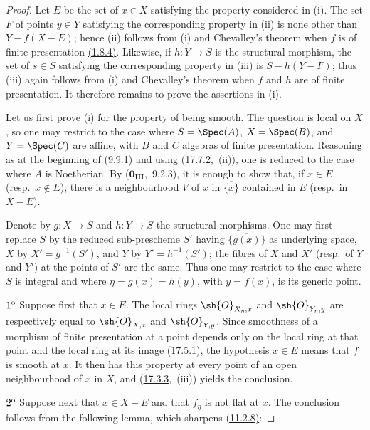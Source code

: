 \begin{proof}
Let $E$ be the set of $x\in X$ satisfying the property considered in (i).
The set $F$ of points $y\in Y$ satisfying the corresponding property in (ii) is none other than $Y-f(X-E)$; hence (ii) follows from (i) and Chevalley's theorem when $f$ is of finite presentation {\hyperlink{ega4.c04.thm.1-8-4}{(1.8.4)}}.
Likewise, if $h:Y\to S$ is the structural morphism, the set of $s\in S$ satisfying the corresponding property in (iii) is $S-h(Y-F)$; thus (iii) again follows from (i) and Chevalley's theorem when $f$ and $h$ are of finite presentation.
It therefore remains to prove the assertions in (i).

Let us first prove (i) for the property of being smooth.
The question is local on $X$, so one may restrict to the case where $S=\Spec(A)$, $X=\Spec(B)$, and $Y=\Spec(C)$ are affine, with $B$ and $C$ algebras of finite presentation.
Reasoning as at the beginning of {\hyperlink{ega4.c04.prop.9-9-1}{(9.9.1)}} and using ({\hyperlink{ega4.c04.cor.17-7-2}{17.7.2}},~(ii)), one is reduced to the case where $A$ is Noetherian.
By ($\mathbf{0}_\mathbf{III}$,~9.2.3), it is enough to show that, if $x\in E$ (resp.\ $x\notin E$), there is a neighbourhood $V$ of $x$ in $\overline{\{x\}}$ contained in $E$ (resp.\ in $X-E$).

Denote by $g:X\to S$ and $h:Y\to S$ the structural morphisms.
One may first replace $S$ by the reduced sub-prescheme $S'$ having $\overline{\{g(x)\}}$ as underlying space, $X$ by $X'=g^{-1}(S')$, and $Y$ by $Y'=h^{-1}(S')$; the fibres of $X$ and $X'$ (resp.\ of $Y$ and $Y'$) at the points of $S'$ are the same.
Thus one may restrict to the case where $S$ is integral and where $\eta=g(x)=h(y)$, with $y=f(x)$, is its generic point.

$1\textsuperscript{o}$ Suppose first that $x\in E$.
The local rings $\sh{O}_{X_\eta,x}$ and $\sh{O}_{Y_\eta,y}$ are respectively equal to $\sh{O}_{X,x}$ and $\sh{O}_{Y,y}$.
Since smoothness of a morphism of finite presentation at a point depends only on the local ring at that point and the local ring at its image {\hyperlink{ega4.c04.thm.17-5-1}{(17.5.1)}}, the hypothesis $x\in E$ means that $f$ is smooth at $x$.
It then has this property at every point of an open neighbourhood of $x$ in $X$, and ({\hyperlink{ega4.c04.prop.17-3-3}{17.3.3}},~(iii)) yields the conclusion.

$2\textsuperscript{o}$ Suppose next that $x\in X-E$ and that $f_\eta$ is not flat at $x$.
The conclusion follows from the following lemma, which sharpens {\hyperlink{ega4.c04.prop.11-2-8}{(11.2.8)}}:


\end{proof}
